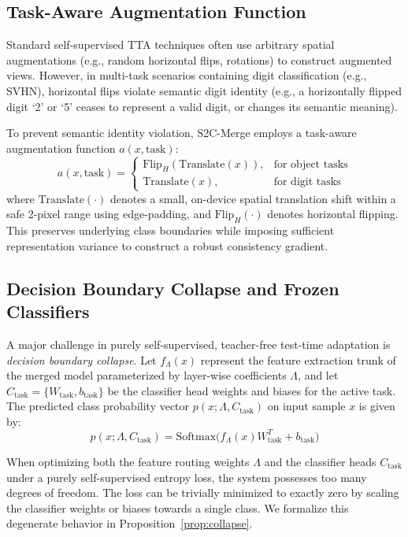 \documentclass{article}
\theoremstyle{plain}
\theoremstyle{definition}
\theoremstyle{remark}
\begin{document}
\subsection{Task-Aware Augmentation Function}
Standard self-supervised TTA techniques often use arbitrary spatial augmentations (e.g., random horizontal flips, rotations) to construct augmented views. However, in multi-task scenarios containing digit classification (e.g., SVHN), horizontal flips violate semantic digit identity (e.g., a horizontally flipped digit `2' or `5' ceases to represent a valid digit, or changes its semantic meaning). 

To prevent semantic identity violation, S2C-Merge employs a task-aware augmentation function $a(x, \text{task})$:
\begin{equation}
    a(x, \text{task}) = 
    \begin{cases} 
      \text{Flip}_H(\text{Translate}(x)), & \text{for object tasks} \\
      \text{Translate}(x), & \text{for digit tasks} 
   \end{cases}
\end{equation}
where $\text{Translate}(\cdot)$ denotes a small, on-device spatial translation shift within a safe 2-pixel range using edge-padding, and $\text{Flip}_H(\cdot)$ denotes horizontal flipping. This preserves underlying class boundaries while imposing sufficient representation variance to construct a robust consistency gradient.

\subsection{Decision Boundary Collapse and Frozen Classifiers}
\label{subsec:collapse}

A major challenge in purely self-supervised, teacher-free test-time adaptation is \emph{decision boundary collapse}. Let $f_{\Lambda}(x)$ represent the feature extraction trunk of the merged model parameterized by layer-wise coefficients $\Lambda$, and let $C_{\text{task}} = \{W_{\text{task}}, b_{\text{task}}\}$ be the classifier head weights and biases for the active task. The predicted class probability vector $p(x; \Lambda, C_{\text{task}})$ on input sample $x$ is given by:
\begin{equation}
    p(x; \Lambda, C_{\text{task}}) = \text{Softmax}\big( f_{\Lambda}(x) W_{\text{task}}^T + b_{\text{task}} \big)
\end{equation}

When optimizing both the feature routing weights $\Lambda$ and the classifier heads $C_{\text{task}}$ under a purely self-supervised entropy loss, the system possesses too many degrees of freedom. The loss can be trivially minimized to exactly zero by scaling the classifier weights or biases towards a single class. We formalize this degenerate behavior in Proposition~\ref{prop:collapse}.
\end{document}
